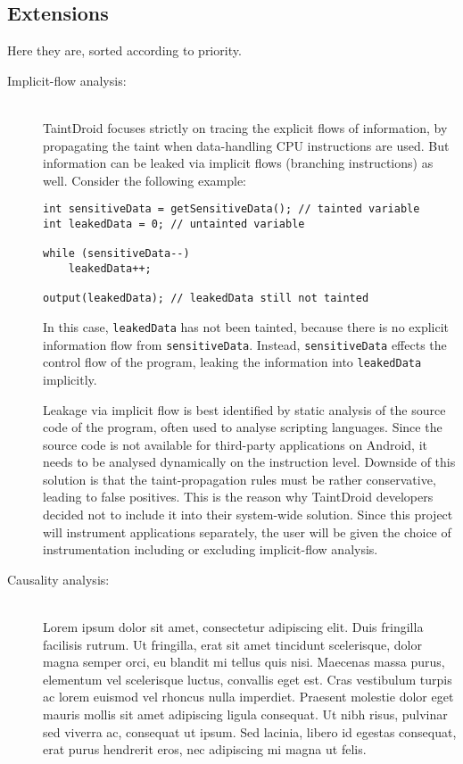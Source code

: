 \documentclass[12pt]{article}
\begin{document}
\subsection*{Extensions}

Here they are, sorted according to priority.

\begin{description}
\item [Implicit-flow analysis:] \ \\
TaintDroid focuses strictly on tracing the explicit flows of information, 
by propagating the taint when data-handling CPU instructions are used. 
But information can be leaked via implicit flows (branching instructions) 
as well. Consider the following example:

\begin{verbatim}
int sensitiveData = getSensitiveData(); // tainted variable
int leakedData = 0; // untainted variable

while (sensitiveData--)
    leakedData++;

output(leakedData); // leakedData still not tainted
\end{verbatim}

In this case, \verb|leakedData| has not been tainted, because there is 
no explicit information flow from \verb|sensitiveData|. Instead, 
\verb|sensitiveData| effects the control flow of the program, leaking
the information into \verb|leakedData| implicitly. 

Leakage via implicit flow is best identified by static analysis of the 
source code of the program, often used to analyse scripting languages. 
Since the source code is not available for third-party applications on 
Android, it needs to be analysed dynamically on the instruction level.
Downside of this solution is that the taint-propagation rules must be
rather conservative, leading to false positives. This is the reason why
TaintDroid developers decided not to include it into their system-wide
solution. Since this project will instrument applications separately, 
the user will be given the choice of instrumentation including or 
excluding implicit-flow analysis.

\item [Causality analysis:] \ \\
Lorem ipsum dolor sit amet, consectetur adipiscing elit. Duis fringilla facilisis rutrum. Ut fringilla, erat sit amet tincidunt scelerisque, dolor magna semper orci, eu blandit mi tellus quis nisi. Maecenas massa purus, elementum vel scelerisque luctus, convallis eget est. Cras vestibulum turpis ac lorem euismod vel rhoncus nulla imperdiet. Praesent molestie dolor eget mauris mollis sit amet adipiscing ligula consequat. Ut nibh risus, pulvinar sed viverra ac, consequat ut ipsum. Sed lacinia, libero id egestas consequat, erat purus hendrerit eros, nec adipiscing mi magna ut felis.


\end{description}
\end{document}
